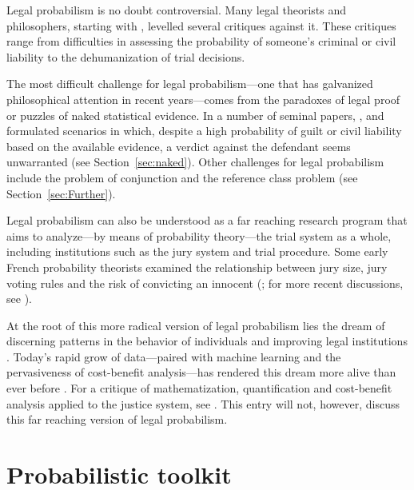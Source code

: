 \documentclass{article}
\begin{document}
Legal probabilism is no doubt controversial. 
Many legal theorists and philosophers, starting with \cite{tribe71}, levelled several critiques against it. These critiques range from  difficulties in assessing the probability of someone's criminal or civil liability to the dehumanization of trial decisions. 


The most difficult  challenge for legal probabilism---one that has galvanized philosophical attention in recent years---comes from the paradoxes of legal proof or puzzles of naked statistical evidence. In  a number of seminal papers, \cite{Nesson1979Reasonable-doub}, \cite{Cohen81} and \cite{Thomson86}  formulated  scenarios in which, despite a high probability of guilt or civil liability based on the available evidence, a verdict against the defendant seems unwarranted  (see Section~\ref{sec:naked}).
Other challenges for legal probabilism include the problem of conjunction and the reference class problem  (see Section~\ref{sec:Further}).


Legal probabilism can also be understood as a far reaching research program that aims to analyze---by means of probability theory---the trial system as a whole, including institutions such as the jury system and trial procedure. Some early French probability theorists examined the relationship between jury size, jury voting rules and the risk of convicting an innocent  
(\citealp{condorcet1785, Laplace1814, Poisson1837}; for more recent discussions, see \citealp{kaye1980, nitzan2010, suzuki2015}).

At the root of this more radical version of legal probabilism lies the dream of discerning patterns in the behavior of individuals and improving legal institutions \citep{hacking1990}. Today's rapid grow of data---paired with machine learning and the pervasiveness of cost-benefit analysis---has rendered  this dream more alive than ever before \citep{ferguson2020bigdata}.  For a critique of mathematization, quantification and cost-benefit analysis applied to the justice system, see \citep{harcourt2018}. 
This entry will not, however, discuss this far reaching version of legal probabilism.


\tableofcontents













\section{Probabilistic toolkit}
\end{document}
